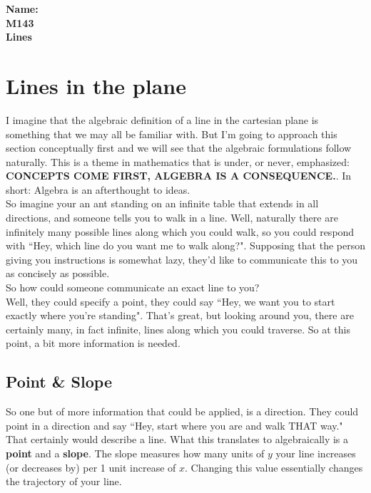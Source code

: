 \documentclass[10pt]{article}
\theoremstyle{definition}
\begin{document}
%

{\bf Name:} \hrulefill\hrulefill\hrulefill\\
{\bf M143} \qquad \qquad \\
{\bf Lines}\\ %



\section{Lines in the plane}


I imagine that the algebraic definition of a line in the cartesian plane is something that we may all be familiar with.  But I'm going to approach this section  conceptually first and we will see that the algebraic formulations follow naturally.  This is a theme in mathematics that is under, or never, emphasized: \textbf{CONCEPTS COME FIRST, ALGEBRA IS A CONSEQUENCE.}. In short: Algebra is an afterthought to ideas.\\

So imagine your an ant standing on an infinite table that extends in all directions, and someone tells you to walk in a line.  Well, naturally there are infinitely many possible lines along which you could walk, so you could respond with ``Hey, which line do you want me to walk along?".  Supposing that the person giving you instructions is somewhat lazy, they'd like to communicate this to you as concisely as possible.\\

So how could someone communicate an exact line to you?\\

Well, they could specify a point, they could say 	``Hey, we want you to start exactly where you're standing".  That's great, but looking around you, there are certainly many, in fact infinite, lines along which you could traverse.  So at this point, a bit more information is needed.


\subsection{Point \& Slope}


So one but of more information that could be applied, is a direction.  They could point in a direction and say ``Hey, start where you are and walk THAT way."  That certainly would describe a line.  What this translates to algebraically is a {\bf point} and a {\bf slope}.   The slope measures how many units of $y$ your line increases (or decreases by) per 1 unit increase of $x$.  Changing this value essentially changes the trajectory of your line.\\
\end{document}
